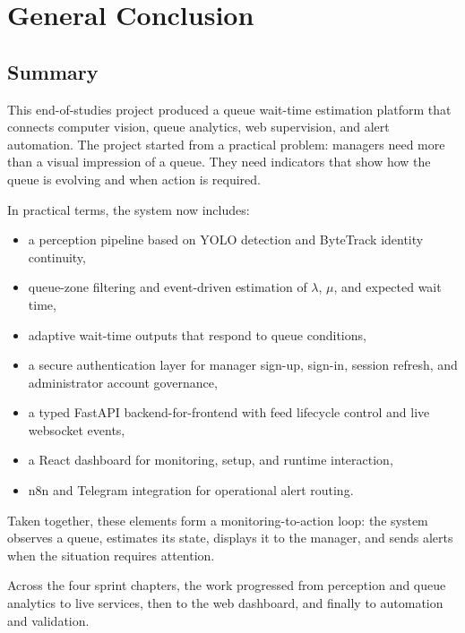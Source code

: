 \chapter{General Conclusion}
\chaptertoc
\clearpage

\section{Summary}
This end-of-studies project produced a queue wait-time estimation platform that connects computer vision, queue analytics, web supervision, and alert automation. The project started from a practical problem: managers need more than a visual impression of a queue. They need indicators that show how the queue is evolving and when action is required.

In practical terms, the system now includes:
\begin{itemize}
    \item a perception pipeline based on YOLO detection and ByteTrack identity continuity,
    \item queue-zone filtering and event-driven estimation of $\lambda$, $\mu$, and expected wait time,
    \item adaptive wait-time outputs that respond to queue conditions,
    \item a secure authentication layer for manager sign-up, sign-in, session refresh, and administrator account governance,
    \item a typed FastAPI backend-for-frontend with feed lifecycle control and live websocket events,
    \item a React dashboard for monitoring, setup, and runtime interaction,
    \item n8n and Telegram integration for operational alert routing.
\end{itemize}

Taken together, these elements form a monitoring-to-action loop: the system observes a queue, estimates its state, displays it to the manager, and sends alerts when the situation requires attention.

Across the four sprint chapters, the work progressed from perception and queue analytics to live services, then to the web dashboard, and finally to automation and validation.

